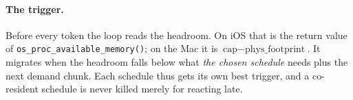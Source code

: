 \paragraph{The trigger.}
Before every token the loop reads the headroom.
On iOS that is the return value of \texttt{os\_proc\_available\_memory()}; on the Mac it is $\text{cap}-\text{phys\_footprint}$.
It migrates when the headroom falls below what \emph{the chosen schedule} needs plus the next demand chunk.
Each schedule thus gets its own best trigger, and a co-resident schedule is never killed merely for reacting late.
